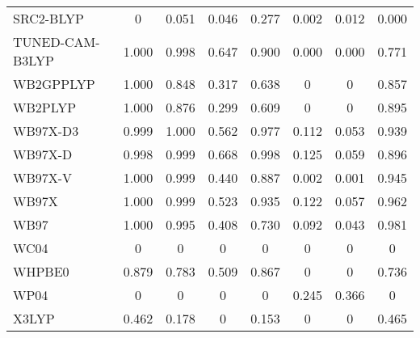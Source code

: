 \begin{table}
\begin{tabular}{|l|c|c|c|c|c|c|c|}
SRC2-BLYP~\cite{Besley2009_10350} & 0 & 0.051 & 0.046 & 0.277 & 0.002 & 0.012 & 0.000 \\
TUNED-CAM-B3LYP~\cite{Okuno2012_29} & 1.000 & 0.998 & 0.647 & 0.900 & 0.000 & 0.000 & 0.771 \\
WB2GPPLYP~\cite{CasanovaPaez2019_4735} & 1.000 & 0.848 & 0.317 & 0.638 & 0 & 0 & 0.857 \\
WB2PLYP~\cite{CasanovaPaez2019_4735} & 1.000 & 0.876 & 0.299 & 0.609 & 0 & 0 & 0.895 \\
WB97X-D3~\cite{Lin2013_263} & 0.999 & 1.000 & 0.562 & 0.977 & 0.112 & 0.053 & 0.939 \\
WB97X-D~\cite{Chai2008_6615} & 0.998 & 0.999 & 0.668 & 0.998 & 0.125 & 0.059 & 0.896 \\
WB97X-V~\cite{Mardirossian2014_9904} & 1.000 & 0.999 & 0.440 & 0.887 & 0.002 & 0.001 & 0.945 \\
WB97X~\cite{Chai2008_084106} & 1.000 & 0.999 & 0.523 & 0.935 & 0.122 & 0.057 & 0.962 \\
WB97~\cite{Chai2008_084106} & 1.000 & 0.995 & 0.408 & 0.730 & 0.092 & 0.043 & 0.981 \\
WC04~\cite{Wiitala2006_1085} & 0 & 0 & 0 & 0 & 0 & 0 & 0 \\
WHPBE0~\cite{Shao2020_587} & 0.879 & 0.783 & 0.509 & 0.867 & 0 & 0 & 0.736 \\
WP04~\cite{Wiitala2006_1085} & 0 & 0 & 0 & 0 & 0.245 & 0.366 & 0 \\
X3LYP~\cite{Xu2004_2673} & 0.462 & 0.178 & 0 & 0.153 & 0 & 0 & 0.465 \\
\bottomrule
\end{tabular}
\end{table}
